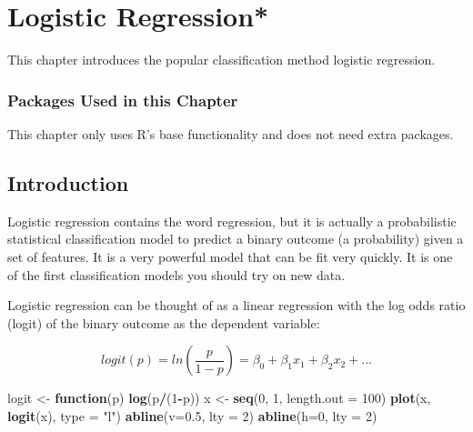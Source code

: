 \documentclass[
  notitlepage]{book}
\newenvironment{Shaded}{\begin{snugshade}}{\end{snugshade}}
\newcommand{\ControlFlowTok}[1]{\textcolor[rgb]{0.13,0.29,0.53}{\textbf{#1}}}
\newcommand{\DataTypeTok}[1]{\textcolor[rgb]{0.13,0.29,0.53}{#1}}
\newcommand{\DecValTok}[1]{\textcolor[rgb]{0.00,0.00,0.81}{#1}}
\newcommand{\FloatTok}[1]{\textcolor[rgb]{0.00,0.00,0.81}{#1}}
\newcommand{\KeywordTok}[1]{\textcolor[rgb]{0.13,0.29,0.53}{\textbf{#1}}}
\newcommand{\NormalTok}[1]{#1}
\newcommand{\OperatorTok}[1]{\textcolor[rgb]{0.81,0.36,0.00}{\textbf{#1}}}
\newcommand{\StringTok}[1]{\textcolor[rgb]{0.31,0.60,0.02}{#1}}
\begin{document}
\hypertarget{logistic-regression-1}{%
\chapter{Logistic Regression*}\label{logistic-regression-1}}

This chapter introduces the popular classification method
logistic regression.

\hypertarget{packages-used-in-this-chapter-7}{%
\subsection*{Packages Used in this Chapter}\label{packages-used-in-this-chapter-7}}

This chapter only uses R's base functionality and does not need extra packages.

\hypertarget{introduction-2}{%
\section{Introduction}\label{introduction-2}}

Logistic regression contains the word regression, but it is actually a
probabilistic statistical classification
model to predict a binary outcome (a probability) given a set of features.
It is a very powerful model that can be fit very quickly. It is one of the
first classification models you should try on new data.

Logistic regression can be thought of as a linear regression with the
log odds ratio (logit)
of the binary outcome as the dependent variable:

\[logit(p) = ln(\frac{p}{1-p}) = \beta_0 + \beta_1 x_1 + \beta_2 x_2 + ...\]

\begin{Shaded}
\begin{Highlighting}[]
\NormalTok{logit  \textless{}{-}}\StringTok{ }\ControlFlowTok{function}\NormalTok{(p) }\KeywordTok{log}\NormalTok{(p}\OperatorTok{/}\NormalTok{(}\DecValTok{1}\OperatorTok{{-}}\NormalTok{p))}
\NormalTok{x \textless{}{-}}\StringTok{ }\KeywordTok{seq}\NormalTok{(}\DecValTok{0}\NormalTok{, }\DecValTok{1}\NormalTok{, }\DataTypeTok{length.out =} \DecValTok{100}\NormalTok{)}
\KeywordTok{plot}\NormalTok{(x, }\KeywordTok{logit}\NormalTok{(x), }\DataTypeTok{type =} \StringTok{"l"}\NormalTok{)}
\KeywordTok{abline}\NormalTok{(}\DataTypeTok{v=}\FloatTok{0.5}\NormalTok{, }\DataTypeTok{lty =} \DecValTok{2}\NormalTok{)}
\KeywordTok{abline}\NormalTok{(}\DataTypeTok{h=}\DecValTok{0}\NormalTok{, }\DataTypeTok{lty =} \DecValTok{2}\NormalTok{)}
\end{Highlighting}
\end{Shaded}
\end{document}
